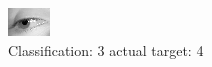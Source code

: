 \begin{figure}[h!]
\begin{center}
\includegraphics[width=0.60\columnwidth]{figures/ID3039_class_3_target_4.png}
\end{center}
\caption{ Classification: 3 actual target: 4}
\label{fig:ID3039_class_3_target_4}
\end{figure}
